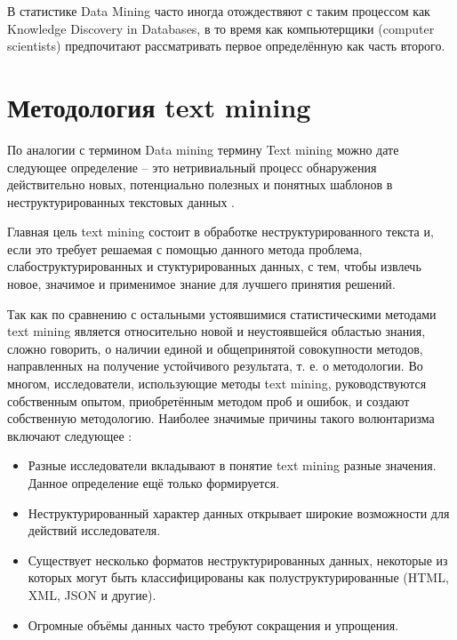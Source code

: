 В статистике Data Mining часто иногда отождествяют с таким процессом как Knowledge Discovery in Databases, в то время как компьютерщики (computer scientists) предпочитают рассматривать первое определённую как часть второго.





\section{Методология text mining} \label{sect1_3}

По аналогии с термином Data mining термину Text mining можно дате следующее определение -- это нетривиальный процесс обнаружения действительно новых, потенциально полезных и понятных шаблонов в неструктурированных текстовых данных \cite[стр. 211]{bargesyan2009}.

Главная цель text mining состоит в обработке неструктурированного текста и, если это требует решаемая с помощью данного метода проблема, слабоструктурированных и стуктурированных данных, с тем, чтобы извлечь новое, значимое и применимое знание для лучшего принятия решений\cite[стр. 78]{practical_tm}.

Так как по сравнению с остальными устоявшимися статистическими методами text mining является относительно новой и неустоявшейся областью знания, сложно говорить, о наличии единой и общепринятой совокупности методов, направленных на получение устойчивого результата, т. е. о методологии. Во многом, исследователи, использующие методы text mining, руководствуются собственным опытом, приобретённым методом проб и ошибок, и создают собственную методологию. Наиболее значимые причины такого волюнтаризма включают следующее \cite[стр. 74]{practical_tm}:
\begin{itemize}
\item Разные исследователи вкладывают в понятие text mining разные значения. Данное определение ещё только формируется.
\item Неструктурированный характер данных открывает широкие возможности для действий исследователя.
\item Существует несколько форматов неструктурированных данных, некоторые из которых могут быть классифицированы как полуструктурированные (HTML, XML, JSON и другие).
\item Огромные объёмы данных часто требуют сокращения и упрощения.
\end{itemize}

